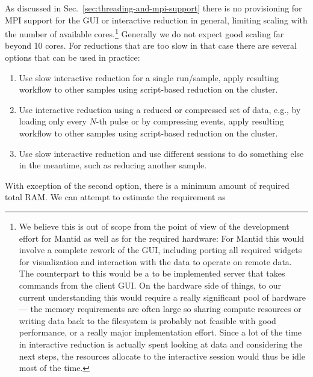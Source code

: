 \documentclass[a4paper,english,numbers=noenddot,bibliography=totoc,chapterprefix=on,DIV=12]{scrartcl}
\newcommand{\mantid}{Mantid\xspace}
\begin{document}
As discussed in Sec.~\ref{sec:threading-and-mpi-support} there is no provisioning for MPI support for the GUI or interactive reduction in general, limiting scaling with the number of available cores.\footnote{We believe this is out of scope from the point of view of the development effort for \mantid as well as for the required hardware: For \mantid this would involve a complete rework of the GUI, including porting all required widgets for visualization and interaction with the data to operate on remote data. The counterpart to this would be a to be implemented server that takes commands from the client GUI. On the hardware side of things, to our current understanding this would require a really significant pool of hardware --- the memory requirements are often large so sharing compute resources or writing data back to the filesystem is probably not feasible with good performance, or a really major implementation effort. Since a lot of the time in interactive reduction is actually spent looking at data and considering the next steps, the resources allocate to the interactive session would thus be idle most of the time.}
Generally we do not expect good scaling far beyond 10 cores.
For reductions that are too slow in that case there are several options that can be used in practice:
\begin{enumerate}
  \item Use slow interactive reduction for a single run/sample, apply resulting workflow to other samples using script-based reduction on the cluster.
  \item Use interactive reduction using a reduced or compressed set of data, e.g., by loading only every $N$-th pulse or by compressing events, apply resulting workflow to other samples using script-based reduction on the cluster.
  \item Use slow interactive reduction and use different sessions to do something else in the meantime, such as reducing another sample.
\end{enumerate}
With exception of the second option, there is a minimum amount of required total RAM.
We can attempt to estimate the requirement as
\end{document}
